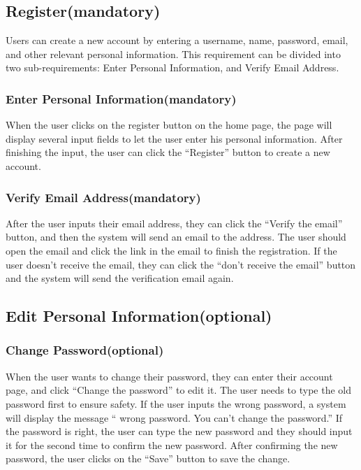 \documentclass[conference]{IEEEtran}
\begin{document}
\subsection{  Register(mandatory)}

Users can create a new account by entering a username, name, password, email,
and other relevant personal information. This requirement can be divided into 
two sub-requirements: Enter Personal Information, and Verify Email Address.

\subsubsection{ Enter Personal Information(mandatory)}

When the user clicks on the register button on the home page, the page will display several 
input fields to let the user enter his personal information. After finishing the 
input, the user can click the “Register” button to create a new account.

\subsubsection{ Verify Email Address(mandatory) }

After the user inputs their email address, they can click the “Verify the 
email” button, and then the system will send an email to the address. The user
should open the email and click the link in the email to finish the registration. If 
the user doesn't receive the email, they can click the “don’t receive the email” 
button and the system will send the verification email again.

\subsection{ Edit Personal Information(optional) }

\subsubsection{ Change Password(optional) }

When the user wants to change their password, they can enter their 
account page, and click “Change the password” to edit it. The user needs to 
type the old password first to ensure safety. If the user inputs the wrong 
password, a system will display the message “ wrong password. You can’t 
change the password.” If the password is right, the user can type the new 
password and they should input it for the second time to confirm the new
password. After confirming the new password, the user clicks on the “Save”
button to save the change.
\end{document}

